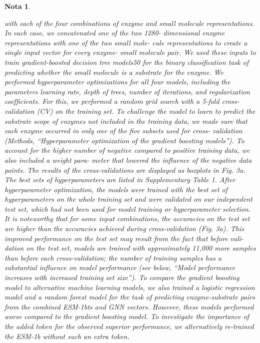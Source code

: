 \documentclass[12pt]{article}
\newtheorem{Note}{Nota}%
\begin{document}
\begin{Note}
\begin{itemize}
with each of the four combinations of enzyme and small molecule
representations. In each case, we concatenated one of the two 1280-
dimensional enzyme representations with one of the two small mole-
cule representations to create a single input vector for every enzyme-
small molecule pair. We used these inputs to train gradient-boosted
decision tree models50 for the binary classiﬁcation task of predicting
whether the small molecule is a substrate for the enzyme.
We performed hyperparameter optimizations for all four models,
including the parameters learning rate, depth of trees, number of
iterations, and regularization coefﬁcients. For this, we performed a
random grid search with a 5-fold cross-validation (CV) on the training
set. To challenge the model to learn to predict the substrate scope of
enzymes not included in the training data, we made sure that each
enzyme occurred in only one of the ﬁve subsets used for cross-
validation (Methods, “Hyperparameter optimization of the gradient
boosting models”). To account for the higher number of negative
compared to positive training data, we also included a weight para-
meter that lowered the inﬂuence of the negative data points. The
results of the cross-validations are displayed as boxplots in Fig. 3a. The
best sets of hyperparameters are listed in Supplementary Table 1. After
hyperparameter optimization, the models were trained with the best
set of hyperparameters on the whole training set and were validated on
our independent test set, which had not been used for model training
or hyperparameter selection. It is noteworthy that for some input
combinations, the accuracies on the test set are higher than the
accuracies achieved during cross-validation (Fig. 3a). This improved
performance on the test set may result from the fact that before vali-
dation on the test set, models are trained with approximately 11,000
more samples than before each cross-validation; the number of
training samples has a substantial inﬂuence on model performance
(see below, “Model performance increases with increased training
set size”). To compare the gradient boosting model to alternative machine
learning models, we also trained a logistic regression model and a
random forest model for the task of predicting enzyme-substrate pairs
from the combined ESM-1bts and GNN vectors. However, these models
performed worse compared to the gradient boosting model. To investigate the importance of the added token for the
observed superior performance, we alternatively re-trained the ESM-1b
without such an extra token.




\end{itemize}
\end{Note}
\end{document}
